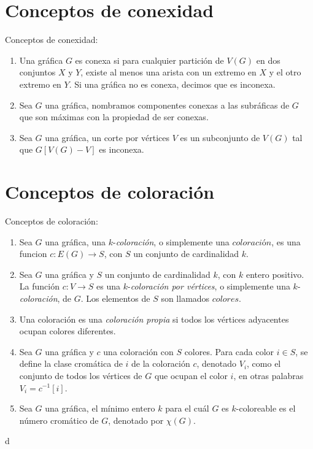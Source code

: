 \section{Conceptos de conexidad}
\label{sec:conexidad}

\begin{definicion} Conceptos de conexidad:
    \label{def:conexidad}
    \begin{enumerate}    
        \item Una gr\'afica $G$ es conexa si para cualquier partici\'on de
        $V(G)$ en dos conjuntos $X$ y $Y$, existe al menos una arista con un
        extremo en $X$ y el otro extremo en $Y$. Si una gr\'afica no es conexa,
        decimos que es inconexa.
        \item Sea $G$ una gr\'afica, nombramos componentes conexas a las
        subr\'aficas de $G$ que son m\'aximas con la propiedad de ser conexas.
        \item Sea $G$ una gr\'afica, un corte por v\'ertices $V$ es un
        subconjunto de $V(G)$ tal que $G[V(G)-V]$ es inconexa.
    \end{enumerate}
\end{definicion}

\section{Conceptos de coloraci\'on}
\label{sec:coloracion}

\begin{definicion} Conceptos de coloraci\'on:
    \label{def:coloracion}
    \begin{enumerate}
        \item Sea $G$ una gr\'afica, una $k$-\textit{coloraci\'on}, o
        simplemente una $\textit{coloraci\'on}$, es una funcion $c \colon
        E(G)\to S$, con $S$ un conjunto de cardinalidad $k$.
        \item Sea $G$ una gr\'afica y $S$ un conjunto de cardinalidad $k$, con
        $k$ entero positivo. La funci\'on $c: V \to S$ es una
        $k$-\textit{coloraci\'on por v\'ertices}, o simplemente una
        $k$-\textit{coloraci\'on}, de $G$. Los elementos de $S$ son llamados
        $\textit{colores}$.
        \item Una coloraci\'on es una \textit{coloraci\'on propia} si todos los
        v\'ertices adyacentes ocupan colores diferentes.
        \item Sea $G$ una gr\'afica y $c$ una coloraci\'on con $S$ colores. Para
        cada color $i \in S$, se define la clase crom\'atica de $i$ de la
        coloraci\'on $c$, denotado $V_i$, como el conjunto de todos los
        v\'ertices de $G$ que ocupan el color $i$, en otras palabras $V_i =
        c^{-1}[i]$.
        \item  Sea $G$ una gr\'afica, el m\'inimo entero $k$ para el cu\'al $G$
        es $k$-coloreable es el n\'umero crom\'atico de $G$, denotado por
        $\chi(G)$.
    \end{enumerate}
\end{definicion}d


